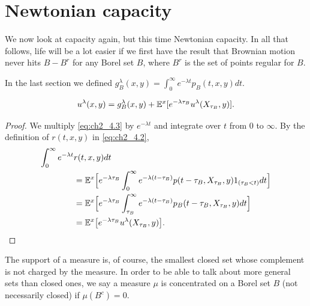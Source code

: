 
\section{Newtonian capacity}\label{ch2_sec5}


We now look at capacity again, but this time Newtonian capacity. In all that follows, life will be a lot easier if we first have the result that Brownian motion never hits $B - B^r$ for any Borel set $B$, where $B^r$ is the set of points regular for $B$.

In the last section we defined $g_B^\lambda(x,y) = \int_0^\infty e^{-\lambda t}p_B(t,x,y)dt$.

\begin{proposition}\label{prop:ch2_5.1}

\begin{equation}\label{eq:ch2_5.1}
u^\lambda(x,y) = g_B^\lambda(x,y) + \mathbb{E}^x[e^{-\lambda\tau_B}u^\lambda(X_{\tau_B},y)].
\end{equation}
\end{proposition}

\begin{proof}
We multiply \eqref{eq:ch2_4.3} by $e^{-\lambda t}$ and integrate over $t$ from 0 to $\infty$. By the definition of $r(t,x,y)$ in \eqref{eq:ch2_4.2},
\begin{align*}
    \int_0^\infty e^{-\lambda t}&r(t,x,y)dt \\
    &= \mathbb{E}^x\Big[e^{-\lambda\tau_B} \int_0^\infty e^{-\lambda(t-\tau_B)}p(t-\tau_B,X_{\tau_B},y)1_{(\tau_B<t)}dt\Big] \\
    &= \mathbb{E}^x\Big[e^{-\lambda\tau_B} \int_{\tau_B}^\infty e^{-\lambda(t-\tau_B)}p_B(t-\tau_B,X_{\tau_B},y)dt\Big] \\
    &= \mathbb{E}^x\big[e^{-\lambda\tau_B}u^\lambda(X_{\tau_B},y)\big].
\end{align*}

\end{proof}

The support of a measure is, of course, the smallest closed set whose complement is not charged by the measure. In order to be able to talk about more general sets than closed ones, we say a measure $\mu$ is concentrated on a Borel set $B$ (not necessarily closed) if $\mu(B^c) = 0$.

\mpagebreak

